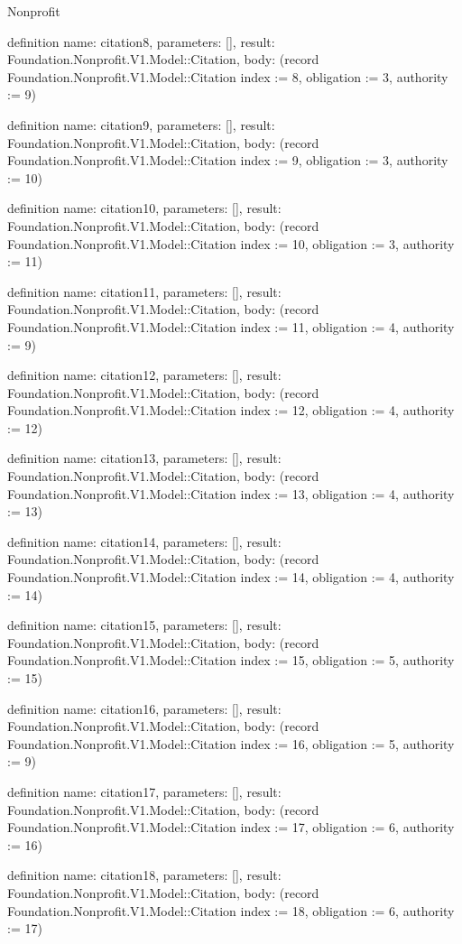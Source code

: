 \begin{lexlean}{Nonprofit}
\begin{semanticmodule}
definition{
  name: citation8,
  parameters: [],
  result: Foundation.Nonprofit.V1.Model::Citation,
  body: (record Foundation.Nonprofit.V1.Model::Citation {index := 8, obligation := 3, authority := 9})
}

definition{
  name: citation9,
  parameters: [],
  result: Foundation.Nonprofit.V1.Model::Citation,
  body: (record Foundation.Nonprofit.V1.Model::Citation {index := 9, obligation := 3, authority := 10})
}

definition{
  name: citation10,
  parameters: [],
  result: Foundation.Nonprofit.V1.Model::Citation,
  body: (record Foundation.Nonprofit.V1.Model::Citation {index := 10, obligation := 3, authority := 11})
}

definition{
  name: citation11,
  parameters: [],
  result: Foundation.Nonprofit.V1.Model::Citation,
  body: (record Foundation.Nonprofit.V1.Model::Citation {index := 11, obligation := 4, authority := 9})
}

definition{
  name: citation12,
  parameters: [],
  result: Foundation.Nonprofit.V1.Model::Citation,
  body: (record Foundation.Nonprofit.V1.Model::Citation {index := 12, obligation := 4, authority := 12})
}

definition{
  name: citation13,
  parameters: [],
  result: Foundation.Nonprofit.V1.Model::Citation,
  body: (record Foundation.Nonprofit.V1.Model::Citation {index := 13, obligation := 4, authority := 13})
}

definition{
  name: citation14,
  parameters: [],
  result: Foundation.Nonprofit.V1.Model::Citation,
  body: (record Foundation.Nonprofit.V1.Model::Citation {index := 14, obligation := 4, authority := 14})
}

definition{
  name: citation15,
  parameters: [],
  result: Foundation.Nonprofit.V1.Model::Citation,
  body: (record Foundation.Nonprofit.V1.Model::Citation {index := 15, obligation := 5, authority := 15})
}

definition{
  name: citation16,
  parameters: [],
  result: Foundation.Nonprofit.V1.Model::Citation,
  body: (record Foundation.Nonprofit.V1.Model::Citation {index := 16, obligation := 5, authority := 9})
}

definition{
  name: citation17,
  parameters: [],
  result: Foundation.Nonprofit.V1.Model::Citation,
  body: (record Foundation.Nonprofit.V1.Model::Citation {index := 17, obligation := 6, authority := 16})
}

definition{
  name: citation18,
  parameters: [],
  result: Foundation.Nonprofit.V1.Model::Citation,
  body: (record Foundation.Nonprofit.V1.Model::Citation {index := 18, obligation := 6, authority := 17})
}


\end{semanticmodule}
\end{lexlean}
